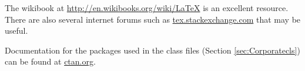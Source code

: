 The wikibook at \href{http://en.wikibooks.org/wiki/LaTeX}{http://en.wikibooks.org/wiki/LaTeX} is an excellent resource. There are also several internet forums such as \href{tex.stackexchange.com}{tex.stackexchange.com} that may be useful.

Documentation for the packages used in the class files (Section \ref{sec:Corporatecls}) can be found at \href{ctan.org}{ctan.org}.
